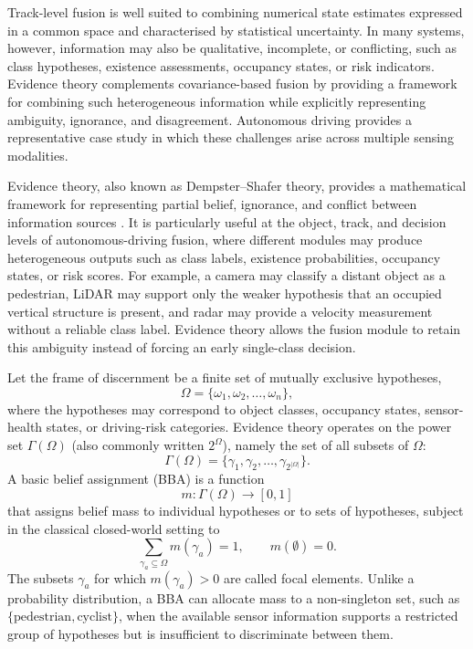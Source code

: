 Track-level fusion is well suited to combining numerical state estimates expressed in a common space and characterised by statistical uncertainty. In many systems, however, information may also be qualitative, incomplete, or conflicting, such as class hypotheses, existence assessments, occupancy states, or risk indicators. Evidence theory complements covariance-based fusion by providing a framework for combining such heterogeneous information while explicitly representing ambiguity, ignorance, and disagreement. Autonomous driving provides a representative case study in which these challenges arise across multiple sensing modalities.

Evidence theory, also known as Dempster--Shafer theory, provides a mathematical framework for representing partial belief, ignorance, and conflict between information sources \cite{shafer_mathematical_1976,dempster_upperlower_2008,smets_transferable_1990}. It is particularly useful at the object, track, and decision levels of autonomous-driving fusion, where different modules may produce heterogeneous outputs such as class labels, existence probabilities, occupancy states, or risk scores. For example, a camera may classify a distant object as a pedestrian, LiDAR may support only the weaker hypothesis that an occupied vertical structure is present, and radar may provide a velocity measurement without a reliable class label. Evidence theory allows the fusion module to retain this ambiguity instead of forcing an early single-class decision.

Let the frame of discernment be a finite set of mutually exclusive hypotheses,
\begin{equation}
\Omega = \{\omega_1, \omega_2, \ldots, \omega_n\},
\end{equation}
where the hypotheses may correspond to object classes, occupancy states, sensor-health states, or driving-risk categories. Evidence theory operates on the power set \(\Gamma(\Omega)\) (also commonly written $2^{\Omega}$), namely the set of all subsets of \(\Omega\):
\begin{equation}
\Gamma(\Omega) = \{\gamma_1, \gamma_2, \ldots, \gamma_{2^{|\Omega|}}\}.
\end{equation}
A basic belief assignment (BBA) is a function
\begin{equation}
m: \Gamma(\Omega) \rightarrow [0,1]
\end{equation}
that assigns belief mass to individual hypotheses or to sets of hypotheses, subject in the classical closed-world setting to
\begin{equation}
\sum_{\gamma_a \subseteq \Omega} m(\gamma_a)=1, \qquad m(\emptyset)=0.
\label{eq:bba}
\end{equation}
The subsets \(\gamma_a\) for which \(m(\gamma_a)>0\) are called focal elements. Unlike a probability distribution, a BBA can allocate mass to a non-singleton set, such as \(\{\text{pedestrian},\text{cyclist}\}\), when the available sensor information supports a restricted group of hypotheses but is insufficient to discriminate between them.

